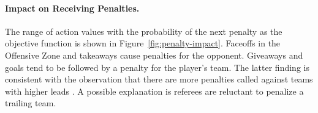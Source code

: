 \documentclass[]{article}
\begin{document}
\paragraph{Impact on Receiving Penalties.}
The range of action values with the probability of the next penalty as the objective function is shown in Figure~\ref{fig:penalty-impact}.
Faceoffs in the Offensive Zone and takeaways cause penalties for the opponent. Giveaways and goals tend to be followed by a penalty for the player's team. The latter finding is consistent with the observation that there are more penalties called against teams with higher leads \citep{Schuckers2012}. A possible explanation is referees are reluctant to penalize a trailing team.
\end{document}
